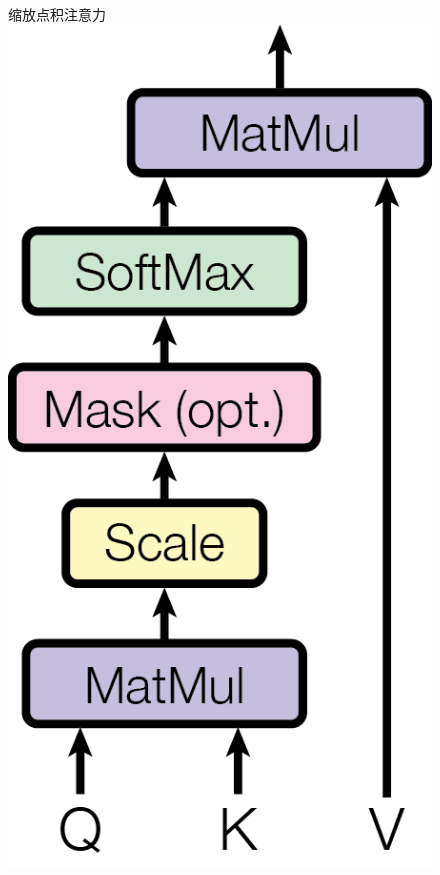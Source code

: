 \begin{figure}
\begin{minipage}[t]{0.5\textwidth}
  \centering
  缩放点积注意力 \\
  \vspace{0.5cm}
  \includegraphics[scale=0.6]{Figures/ModalNet-19}
\end{minipage}
\begin{minipage}[t]{0.5\textwidth}
  \centering 

\end{minipage}
\end{figure}
